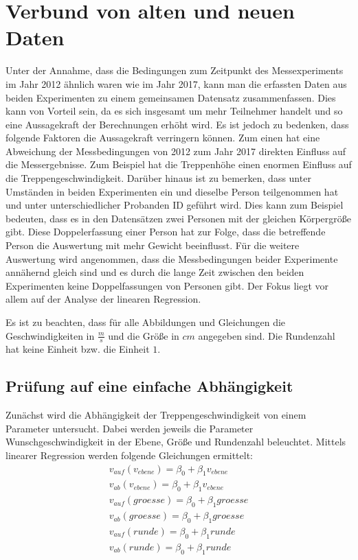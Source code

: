 \section{Verbund von alten und neuen Daten}
Unter der Annahme, dass die Bedingungen zum Zeitpunkt des Messexperiments im Jahr 2012 ähnlich waren wie im Jahr 2017, kann man die erfassten Daten aus beiden Experimenten zu einem gemeinsamen Datensatz zusammenfassen. Dies kann von Vorteil sein, da es sich insgesamt um mehr Teilnehmer handelt und so eine Aussagekraft der Berechnungen erhöht wird. Es ist jedoch zu bedenken, dass folgende Faktoren die Aussagekraft verringern können. Zum einen hat eine Abweichung der Messbedingungen von 2012 zum Jahr 2017 direkten Einfluss auf die Messergebnisse. Zum Beispiel hat die Treppenhöhe einen enormen Einfluss auf die Treppengeschwindigkeit. Darüber hinaus ist zu bemerken, dass unter Umständen in beiden Experimenten ein und dieselbe Person teilgenommen hat und unter unterschiedlicher Probanden ID geführt wird. Dies kann zum Beispiel bedeuten, dass es in den Datensätzen zwei Personen mit der gleichen Körpergröße gibt. Diese Doppelerfassung einer Person hat zur Folge, dass die betreffende Person die Auswertung mit mehr Gewicht beeinflusst. 
Für die weitere Auswertung wird angenommen, dass die Messbedingungen beider Experimente annähernd gleich sind und es durch die lange Zeit zwischen den beiden Experimenten keine Doppelfassungen von Personen gibt. Der Fokus liegt vor allem auf der Analyse der linearen Regression. 

Es ist zu beachten, dass für alle Abbildungen und Gleichungen die Geschwindigkeiten in $\frac{m}{s}$ und die Größe in $cm$ angegeben sind. Die Rundenzahl hat keine Einheit bzw. die Einheit $1$.
\subsection{Prüfung auf eine einfache Abhängigkeit}
Zunächst wird die Abhängigkeit der Treppengeschwindigkeit von einem Parameter untersucht. Dabei werden jeweils die Parameter Wunschgeschwindigkeit in der Ebene, Größe und Rundenzahl beleuchtet. Mittels linearer Regression werden folgende Gleichungen ermittelt: 
\begin{align*}
v_{auf}(v_{ebene}) = \beta _0 + \beta _1 v_{ebene} \\
v_{ab}(v_{ebene}) = \beta _0 + \beta _1 v_{ebene} \\
v_{auf}(groesse) = \beta _0 + \beta _1 groesse \\
v_{ab}(groesse) = \beta _0 + \beta _1 groesse \\
v_{auf}(runde) = \beta _0 + \beta _1 runde \\
v_{ab}(runde) = \beta _0 + \beta _1 runde
\end{align*}

